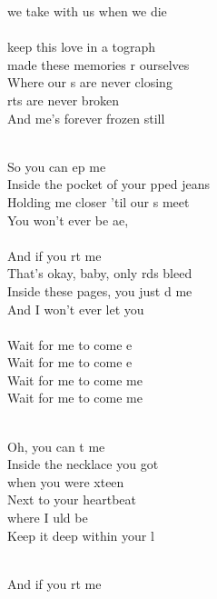 \begin{cancion}[Photograph][Ed Sheeran]
	we take with us when we die \\
\jump\\
	keep this love in a tograph\\
	 made these memories r ourselves\\
	Where our s are never closing\\
	rts are never broken\\
	And me's forever frozen still\\\jump\\
	\begin{chorus}%
	So you can ep me\\
	Inside the pocket of your pped jeans\\
	Holding me closer 'til our s meet\\
	You won't ever be ae, \\
\jump\\
	And if you rt me\\
	That's okay, baby, only rds bleed\\
	Inside these pages, you just d me\\
	And I won't ever let you \\
\jump\\
	Wait for me to come e\\
	Wait for me to come e\\
	Wait for me to come me\\
	Wait for me to come me\\
	\end{chorus}%
	\jump\\
	Oh, you can t me\\
Inside the necklace you got \\
	when you were xteen\\
Next to your heartbeat \\
	where I uld be\\
	Keep it deep within your l\\\jump\\
	\begin{chorus}%
	And if you rt me\\

\end{chorus}
\end{cancion}
